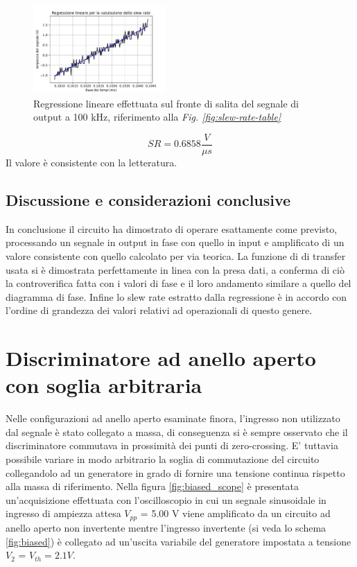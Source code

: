 \documentclass[journal]{IEEEtran}
\begin{document}
\begin{figure}[H]%
\begin {center}
\includegraphics[width=0.45\textwidth]{analysis/output/OPA-slew-rate-fit.pdf}
\caption{Regressione lineare effettuata sul fronte di salita del segnale di output a 100 kHz, riferimento alla \textit{Fig. \ref{fig:slew-rate-table}}}
\label{fig:slew-rate-fit}
\end {center}
\end{figure}
\[SR = 0.6858 \frac{V}{\mu s}\]
Il valore è consistente con la letteratura.
\subsection{\textbf{Discussione e considerazioni conclusive}}
In conclusione il circuito ha dimostrato di operare esattamente come previsto, processando un segnale in output in fase con quello in input e amplificato di un valore consistente con quello calcolato per via teorica. La funzione di di transfer usata si è dimostrata perfettamente in linea con la presa dati, a conferma di ciò la controverifica fatta con i valori di fase e il loro andamento similare a quello del diagramma di fase. Infine lo slew rate estratto dalla regressione è in accordo con l'ordine di grandezza dei valori relativi ad operazionali di questo genere. 
\section{Discriminatore ad anello aperto con soglia arbitraria} %

Nelle configurazioni ad anello aperto esaminate finora, l'ingresso non utilizzato dal segnale è stato collegato a massa, di conseguenza si è sempre osservato che il discriminatore commutava in prossimità dei punti di zero-crossing. E' tuttavia possibile variare in modo arbitrario la soglia di commutazione del circuito collegandolo ad un generatore in grado di fornire una tensione continua rispetto alla massa di riferimento. Nella figura \ref{fig:biased_scope} è presentata un'acquisizione effettuata con l'oscilloscopio in cui un segnale sinusoidale in ingresso di ampiezza attesa $V_{pp}$ = 5.00 V viene amplificato da un circuito ad anello aperto non invertente mentre l'ingresso invertente (si veda lo schema \ref{fig:biased}) è collegato ad un'uscita variabile del generatore impostata a tensione $V_2$ = $V_{th} = 2.1 V$. 
\end{document}
